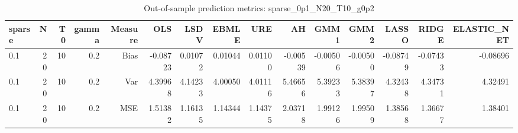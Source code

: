 \begin{table}[!htbp]\centering
\caption{Out-of-sample prediction metrics: sparse_0p1_N20_T10_g0p2}
\label{tab:table3_sparse_0p1_N20_T10_g0p2}
\begin{tabular}{lrrrrrrrrrrrrrr}
\hline
sparse & N & T0 & gamma & Measure & OLS & LSDV & EBMLE & URE & AH & GMM1 & GMM2 & LASSO & RIDGE & ELASTIC_NET \\
\hline
0.1 & 20 & 10 & 0.2 & Bias & -0.08723 & 0.01072 & 0.01044 & 0.01100 & -0.00539 & -0.00506 & -0.00500 & -0.08749 & -0.07433 & -0.08696 \\
0.1 & 20 & 10 & 0.2 & Var & 4.39968 & 4.14233 & 4.00050 & 4.01116 & 5.46656 & 5.39233 & 5.38397 & 4.32438 & 4.34731 & 4.32491 \\
0.1 & 20 & 10 & 0.2 & MSE & 1.51382 & 1.16135 & 1.14344 & 1.14375 & 2.03718 & 1.99126 & 1.99509 & 1.38568 & 1.36677 & 1.38401 \\
\hline
\end{tabular}
\end{table}

